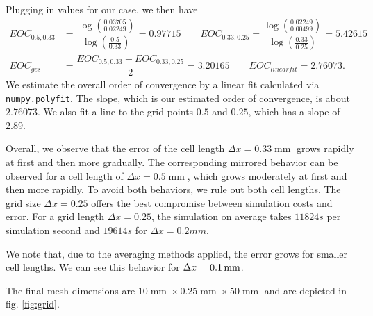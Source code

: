 Plugging in values for our case, we then have
\begin{align*}
    EOC_{0.5,0.33} &= \dfrac{\log \left( \frac{0.03705}{0.02249} \right)}{\log \left( \frac{0.5}{0.33} \right)} = 0.97715
    \qquad EOC_{0.33,0.25} = \dfrac{\log \left( \frac{0.02249}{0.00499} \right)}{\log \left( \frac{0.33}{0.25} \right)} =5.42615 \\
    EOC_{ges} &= \dfrac{EOC_{0.5,0.33} + EOC_{0.33,0.25}}{2} = 3.20165 \qquad EOC_{linearfit} = 2.76073.
\end{align*}
We estimate the overall order of convergence by a linear fit calculated via \lstinline|numpy.polyfit|. The slope, which is our estimated order of convergence, is about $2.76073$. We also fit a line to the grid points $0.5$ and $0.25$, which has a slope of $2.89$.



Overall, we observe that the error of the cell length $\Delta x = 0.33 \operatorname{mm}$ grows rapidly at first and then more gradually.
The corresponding mirrored behavior can be observed for a cell length of $\Delta x = 0.5 \operatorname{mm}$, which grows moderately at first and then more rapidly.
To avoid both behaviors, we rule out both cell lengths.
The grid size $\Delta x = 0.25$ offers the best compromise between simulation costs and error. For a grid length $\Delta x = 0.25$, the simulation on average takes $11824s$ per simulation second and $19614s$ for $\Delta x = 0.2 mm$.

We note that, due to the averaging methods applied, the error grows for smaller cell lengths. We can see this behavior for $\Delta x = 0.1 \operatorname{mm}$.

The final mesh dimensions are $10 \operatorname{mm} \times 0.25 \operatorname{mm} \times 50 \operatorname{mm}$ and are depicted in fig. \ref{fig:grid}.


    
